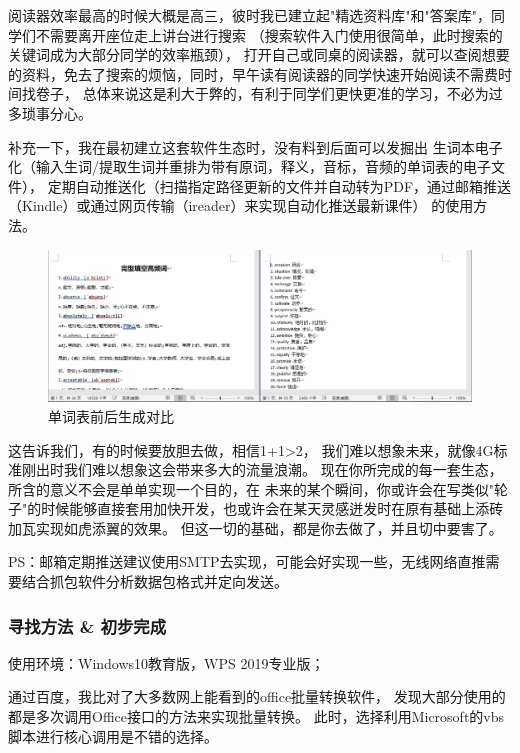 \documentclass[a5paper]{article}
\begin{document}
        阅读器效率最高的时候大概是高三，彼时我已建立起"精选资料库"和"答案库"，同学们不需要离开座位走上讲台进行搜索
        （搜索软件入门使用很简单，此时搜索的关键词成为大部分同学的效率瓶颈），
        打开自己或同桌的阅读器，就可以查阅想要的资料，免去了搜索的烦恼，同时，早午读有阅读器的同学快速开始阅读不需费时间找卷子，
        总体来说这是利大于弊的，有利于同学们更快更准的学习，不必为过多琐事分心。

        补充一下，我在最初建立这套软件生态时，没有料到后面可以发掘出
        生词本电子化（输入生词/提取生词并重排为带有原词，释义，音标，音频的单词表的电子文件），
        定期自动推送化（扫描指定路径更新的文件并自动转为PDF，通过邮箱推送（Kindle）或通过网页传输（ireader）来实现自动化推送最新课件）
        的使用方法。

        \begin{figure}[htbp]
        \centering
        \includegraphics[scale=0.2]{2.2-p1.png}
        \caption*{单词表前后生成对比}
        \end{figure}

        这告诉我们，有的时候要放胆去做，相信1+1>2，
        我们难以想象未来，就像4G标准刚出时我们难以想象这会带来多大的流量浪潮。
        现在你所完成的每一套生态，所含的意义不会是单单实现一个目的，在
        未来的某个瞬间，你或许会在写类似"轮子"的时候能够直接套用加快开发，也或许会在某天灵感迸发时在原有基础上添砖加瓦实现如虎添翼的效果。
        但这一切的基础，都是你去做了，并且切中要害了。

        PS：邮箱定期推送建议使用SMTP去实现，可能会好实现一些，无线网络直推需要结合抓包软件分析数据包格式并定向发送。

        \subsubsection{寻找方法 \& 初步完成}
        使用环境：Windows10教育版，WPS 2019专业版；

        通过百度，我比对了大多数网上能看到的office批量转换软件，
        发现大部分使用的都是多次调用Office接口的方法来实现批量转换。
        此时，选择利用Microsoft的vbs脚本进行核心调用是不错的选择。
        
\end{document}
